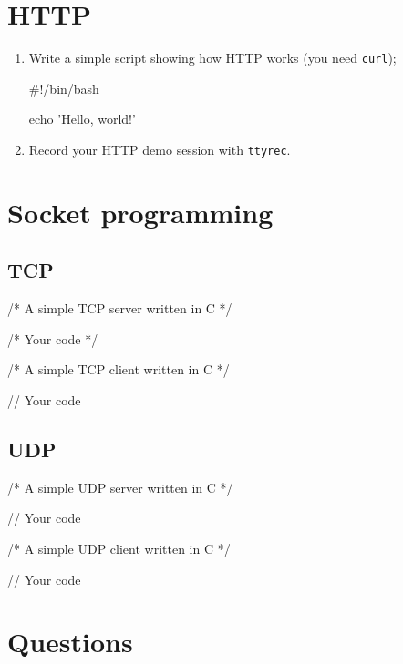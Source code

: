 \documentclass{swfulabreport}
\begin{document}
\section{HTTP}

\begin{enumerate}
\item Write a simple script showing how HTTP works (you need
  \texttt{curl});

  \begin{shcode}
    #!/bin/bash

    echo 'Hello, world!'
  \end{shcode}

\item Record your HTTP demo session with \texttt{ttyrec}.
\end{enumerate}

\section{Socket programming}

\subsection{TCP}

\begin{ccode}
/* A simple TCP server written in C */

/* Your code */
\end{ccode}

\begin{ccode}
/* A simple TCP client written in C */

// Your code
\end{ccode}

\subsection{UDP}

\begin{ccode}
/* A simple UDP server written in C */

// Your code
\end{ccode}

\begin{ccode}
/* A simple UDP client written in C */

// Your code
\end{ccode}

\section{Questions}
\end{document}
